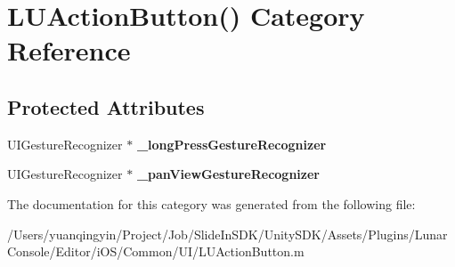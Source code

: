 \hypertarget{category_l_u_action_button_07_08}{}\section{L\+U\+Action\+Button() Category Reference}
\label{category_l_u_action_button_07_08}
\subsection*{Protected Attributes}
\begin{DoxyCompactItemize}
\item 
\mbox{\label{category_l_u_action_button_07_08_a47222daa7227460b6133a650f9dad774}} 
U\+I\+Gesture\+Recognizer $\ast$ {\bfseries \+\_\+long\+Press\+Gesture\+Recognizer}
\item 
\mbox{\label{category_l_u_action_button_07_08_a2e2deda5e3f9c2c0bd3f36e0fd880b4b}} 
U\+I\+Gesture\+Recognizer $\ast$ {\bfseries \+\_\+pan\+View\+Gesture\+Recognizer}
\end{DoxyCompactItemize}


The documentation for this category was generated from the following file\+:\begin{DoxyCompactItemize}
\item 
/\+Users/yuanqingyin/\+Project/\+Job/\+Slide\+In\+S\+D\+K/\+Unity\+S\+D\+K/\+Assets/\+Plugins/\+Lunar\+Console/\+Editor/i\+O\+S/\+Common/\+U\+I/L\+U\+Action\+Button.\+m\end{DoxyCompactItemize}
